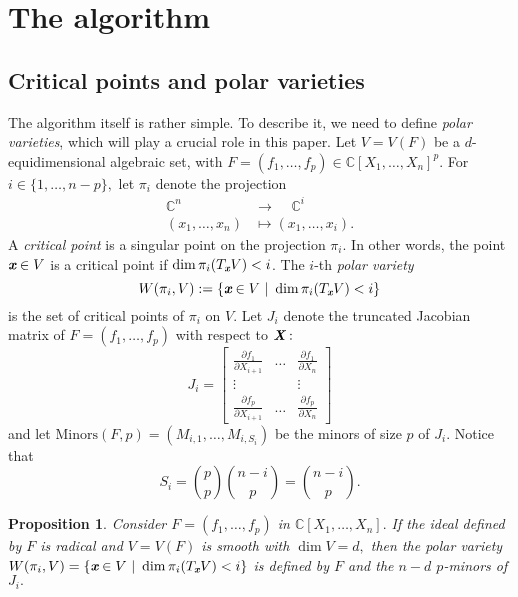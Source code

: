 \documentclass[a4paper]{article}
\def\Xb{\textit{\textbf{X}}}
\def\xb{\textit{\textbf{x}}}
\def\minors{\textrm{Minors}(F,p)}
\def\pa{\partial}
\def\C{\mathbb{C}}
\def\Wi{W(\pi_i,V)}
\newtheorem{prop}[theorem]{Proposition}
\begin{document}
\section{The algorithm}
\subsection{Critical points and polar varieties} 
The algorithm itself is rather simple. To describe it, we need to
define {\em polar varieties}, which will play a crucial role in this paper. Let $V=V(F)$ be a $d$-equidimensional algebraic set, with $F = (f_1,\hdots,f_p) \in \C[X_1,\hdots,X_n]^p$. For $i \in
\{1,\hdots,n-p\},$  let $\pi_i$ denote the projection 
%
\begin{align*}
\C^n~~~~~ &\rightarrow~~~~~ \C^i \\
(x_1,\hdots,x_n) &\mapsto  (x_1,\hdots,x_i).    
\end{align*} 
%
A \textit{critical point} is a singular point on the projection $\pi_i.$ In other words, the point $\xb \in V$ is a critical point if $\dim \pi_i( T_{\xb}V) < i$.
The $i$-th
\textit{polar variety} 
\[
\Wi := \left\{\xb \in V~|~\dim \pi_i(T_\xb
V) < i\right\}
\]
is the set of critical points of $\pi_i$ on $V$. Let $J_i$ denote the truncated Jacobian matrix of $F=(f_1,\hdots,f_p)$ with respect to $\Xb:$
\[
J_i = 
\left[ 
\begin{array}{ccc}
\frac{\pa f_1}{\pa X_{i+1}}&\hdots& \frac{\pa f_1}{\pa X_{n}} \\
\vdots& &\vdots\\
\frac{\pa f_p}{\pa X_{i+1}}&\hdots& \frac{\pa f_p}{\pa X_{n}} 
\end{array}
\right] 
\]
and let $\minors = \left(M_{i,1},\hdots,M_{i,S_i}\right)$ be the minors of size $p$ of $J_i$. Notice that
\[
S_i = \binom{p}{p}\binom{n-i}{p}=\binom{n-i}{p}.
\]
%
\begin{prop}\label{prop:3.1}
Consider $F=(f_1,\hdots,f_p)$ in $\C[X_1,\hdots,X_n].$ If the ideal defined by $F$ is radical and $V = V(F)$ is smooth with $\dim V= d,$ then the polar variety $W(\pi_i,V) = \{\xb \in V~|~\dim \pi_i(T_{\xb}V) < i\}$ is defined by $F$ and the $n-d$ $p$-minors of $J_i.$ 
\end{prop}
\end{document}
